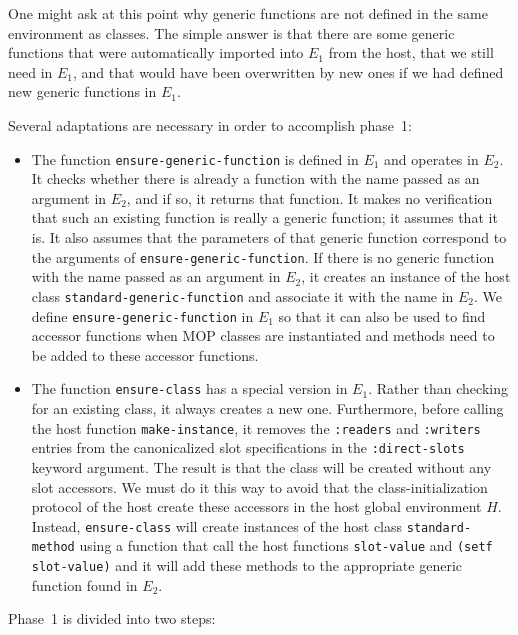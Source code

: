 One might ask at this point why generic functions are not defined in
the same environment as classes.  The simple answer is that there are
some generic functions that were automatically imported into $E_1$
from the host, that we still need in $E_1$, and that would have been
overwritten by new ones if we had defined new generic functions in
$E_1$.

Several adaptations are necessary in order to accomplish phase~1:

\begin{itemize}
\item The function \texttt{ensure-generic-function} is defined in
  $E_1$ and operates in $E_2$.  It checks whether there is already a
  function with the name passed as an argument in $E_2$, and if so, it
  returns that function.  It makes no verification that such an
  existing function is really a generic function; it assumes that it
  is.  It also assumes that the parameters of that generic function
  correspond to the arguments of \texttt{ensure-generic-function}.  If
  there is no generic function with the name passed as an argument in
  $E_2$, it creates an instance of the host class
  \texttt{standard-generic-function} and associate it with the name in
  $E_2$.  We define \texttt{ensure-generic-function} in $E_1$ so that
  it can also be used to find accessor functions when MOP classes are
  instantiated and methods need to be added to these accessor
  functions.
\item The function \texttt{ensure-class} has a special version in
  $E_1$.  Rather than checking for an existing class, it always
  creates a new one.  Furthermore, before calling the host function
  \texttt{make-instance}, it removes the \texttt{:readers} and
  \texttt{:writers} entries from the canonicalized slot specifications
  in the \texttt{:direct-slots} keyword argument.  The result is that
  the class will be created without any slot accessors.  We must do it
  this way to avoid that the class-initialization protocol of the host
  create these accessors in the host global environment $H$.  Instead,
  \texttt{ensure-class} will create instances of the host class
  \texttt{standard-method} using a function that call the host
  functions \texttt{slot-value} and \texttt{(setf slot-value)} and it
  will add these methods to the appropriate generic function found in
  $E_2$.
\end{itemize}

Phase~1 is divided into two steps:

